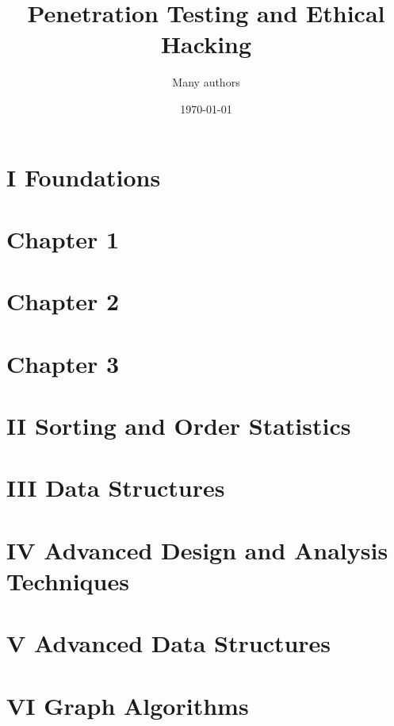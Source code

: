 \documentclass[11pt,a4paper]{book}
\title{Penetration Testing and Ethical Hacking}
\author{Many authors}
\date{\today}
\begin{document}

\frontmatter
\maketitle

\tableofcontents
\listoffigures
\listoftables

\mainmatter


\section*{I Foundations}
\pagebreak

\nocite{*}

\section*{Chapter 1}

\pagebreak

\section*{Chapter 2}

\pagebreak


\section*{Chapter 3}

\pagebreak

\section*{II Sorting and Order Statistics}
\pagebreak


\section*{III Data Structures}
\pagebreak


\section*{IV Advanced Design and Analysis Techniques}
\pagebreak

\section*{V Advanced Data Structures}
\pagebreak


\section*{VI Graph Algorithms}
\pagebreak



\end{document}
